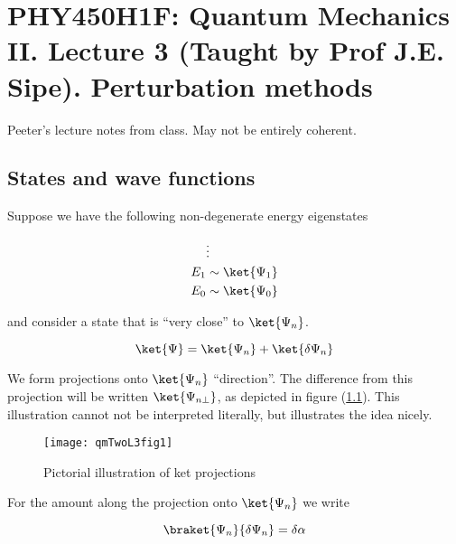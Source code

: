 
%

\chapter{PHY450H1F: Quantum Mechanics II.  Lecture 3 (Taught by Prof J.E. Sipe).  Perturbation methods}
\label{chap:qmTwoL3}
{}
\date{Sept 19, 2011}

\beginArtWithToc

Peeter's lecture notes from class.  May not be entirely coherent.

\section{States and wave functions}

Suppose we have the following non-degenerate energy eigenstates

\begin{align*}
&\vdots \\
E_1 &\sim \ket{\Psi_1} \\
E_0 &\sim \ket{\Psi_0}
\end{align*}

and consider a state that is ``very close'' to $\ket{\Psi_n}$.

\begin{equation}\label{eqn:qmTwoL3:10}
\ket{\Psi} = \ket{\Psi_n} + \ket{\delta \Psi_n}
\end{equation}

We form projections onto $\ket{\Psi_n}$ ``direction''.  The difference from this projection will be written $\ket{\Psi_{n \perp}}$, as depicted in figure (\ref{fig:qmTwoL3fig1}).  This illustration cannot not be interpreted literally, but illustrates the idea nicely.

\begin{figure}[htp]
\centering
\texttt{[image: qmTwoL3fig1]}
\caption{Pictorial illustration of ket projections}\label{fig:qmTwoL3fig1}
\end{figure}

For the amount along the projection onto $\ket{\Psi_n}$ we write

\begin{equation}\label{eqn:qmTwoL3:30}
\braket{\Psi_n}{\delta \Psi_n} = \delta \alpha
\end{equation}

